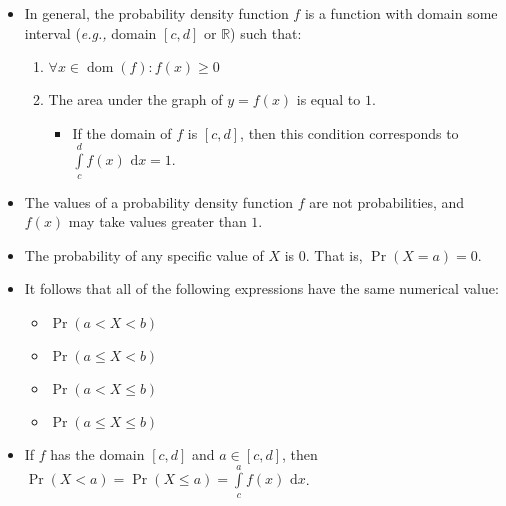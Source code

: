 \documentclass[12pt,a4paper,titlepage]{article}
\DeclareMathOperator{\dom}{dom}
\newcommand{\intd}[1]{\text{ d}#1}
\begin{document}
            \begin{SummaryBox}[title=Probability density functions]
                \begin{itemize}[leftmargin=*]
                    \item In general, the probability density function $f$ is a function with domain some interval (\textit{e.g.,} domain $[c,d]$ or $\mathbb{R}$) such that:
                    \begin{enumerate}[topsep=0pt]
                        \item $\forall x \in \dom(f): f(x) \geq 0$
                        \item The area under the graph of $y=f(x)$ is equal to $1$.
                        \begin{itemize}[topsep=0pt]
                            \item If the domain of $f$ is $[c,d]$, then this condition corresponds to $\int\limits_c^d f(x)\intd{x} = 1$.
                        \end{itemize}
                    \end{enumerate}
                    \item The values of a probability density function $f$ are not probabilities, and $f(x)$ may take values greater than $1$.
                    \item The probability of any specific value of $X$ is $0$. That is, $\Pr(X=a)=0$.
                    \item It follows that all of the following expressions have the same numerical value:
                    \begin{multicols}{4}
                        \begin{itemize}[topsep=0pt]
                            \item $\Pr(a < X < b)$
                            \item $\Pr(a \leq X < b)$
                            \item $\Pr(a < X \leq b)$
                            \item $\Pr(a \leq X \leq b)$
                        \end{itemize}
                    \end{multicols}
                    \item If $f$ has the domain $[c,d]$ and $a \in [c,d]$, then $\Pr(X < a) = \Pr(X \leq a) = \int\limits_c^a f(x)\intd{x}$.
                \end{itemize}
                

\end{SummaryBox}
\end{document}
